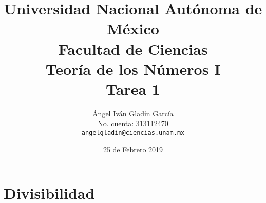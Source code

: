 \documentclass[11pt,letterpaper]{article}
\theoremstyle{definition}\newtheorem{p}{Ejercicio}
\theoremstyle{definition}\newtheorem{pp}[p]{$(*)$Ejercicio}
\numberwithin{p}{section}
\begin{document}
\title{
    \vspace{-1.5cm}
        Universidad Nacional Autónoma de México\\
        Facultad de Ciencias\\
        Teoría de los Números I\\
    \vspace{.5cm}
    \large
        \textbf{Tarea 1}\\        
}
\author{
    Ángel Iván Gladín García\\
    No. cuenta: 313112470\\
    \texttt{angelgladin@ciencias.unam.mx}
}
\date{25 de Febrero 2019}
\maketitle

\newtheorem{theorem}{Teorema}
\newtheorem{example}{Ejemplo}
\newtheorem{corollary}{Corolario}
\newtheorem{lemma}{Lemma}
\newtheorem{definition}{Definición}
\newtheorem{prop}{Proposición}



\section{Divisibilidad}
\end{document}
